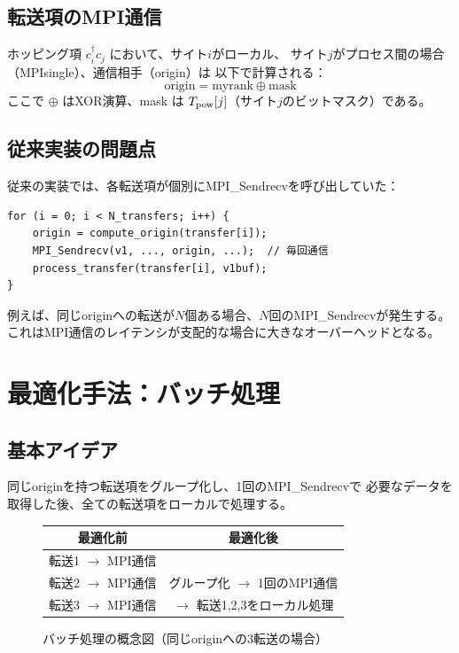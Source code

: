 \documentclass[11pt,a4paper]{article}
\begin{document}
\subsection{転送項のMPI通信}

ホッピング項 $c^\dagger_i c_j$ において、サイト$i$がローカル、
サイト$j$がプロセス間の場合（MPIsingle）、通信相手（origin）は
以下で計算される：
\begin{equation}
  \text{origin} = \text{myrank} \oplus \text{mask}
\end{equation}
ここで $\oplus$ はXOR演算、mask は $T_{\rm pow}[j]$（サイト$j$のビットマスク）である。

\subsection{従来実装の問題点}

従来の実装では、各転送項が個別にMPI\_Sendrecvを呼び出していた：

\begin{lstlisting}[caption=従来のMPIsingle処理（概念図）]
for (i = 0; i < N_transfers; i++) {
    origin = compute_origin(transfer[i]);
    MPI_Sendrecv(v1, ..., origin, ...);  // 毎回通信
    process_transfer(transfer[i], v1buf);
}
\end{lstlisting}

例えば、同じoriginへの転送が$N$個ある場合、$N$回のMPI\_Sendrecvが発生する。
これはMPI通信のレイテンシが支配的な場合に大きなオーバーヘッドとなる。

\section{最適化手法：バッチ処理}

\subsection{基本アイデア}

同じoriginを持つ転送項をグループ化し、1回のMPI\_Sendrecvで
必要なデータを取得した後、全ての転送項をローカルで処理する。

\begin{figure}[h]
\centering
\begin{tabular}{cc}
\textbf{最適化前} & \textbf{最適化後} \\
\hline
転送1 $\rightarrow$ MPI通信 & \\
転送2 $\rightarrow$ MPI通信 & グループ化 $\rightarrow$ 1回のMPI通信 \\
転送3 $\rightarrow$ MPI通信 & $\rightarrow$ 転送1,2,3をローカル処理 \\
\end{tabular}
\caption{バッチ処理の概念図（同じoriginへの3転送の場合）}
\end{figure}
\end{document}
